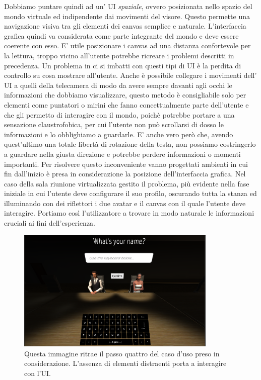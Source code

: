 Dobbiamo puntare quindi ad un' UI \textit{spaziale}, ovvero posizionata nello spazio del mondo virtuale ed indipendente dai movimenti del visore. Questo permette una navigazione visiva tra gli elementi dei canvas semplice e naturale. L'interfaccia grafica quindi va considerata come parte integrante del mondo e deve essere coerente con esso. E' utile posizionare i canvas ad una distanza confortevole per la lettura, troppo vicino all'utente potrebbe ricreare i problemi descritti in precedenza. Un problema in ci si imbatti con questi tipi di UI è la perdita di controllo su cosa mostrare all'utente. Anche è possibile collegare i movimenti dell' UI a quelli della telecamera di modo da avere sempre davanti agli occhi le informazioni che dobbiamo visualizzare, questo metodo è consigliabile solo per elementi come puntatori o mirini che fanno concettualmente parte dell'utente e che gli permetto di interagire con il mondo, poichè potrebbe portare a una sensazione claustrofobica, per cui l'utente non può scrollarsi di dosso le informazioni e lo obblighiamo a guardarle. E' anche vero però che, avendo quest'ultimo una totale libertà di rotazione della testa, non possiamo costringerlo a guardare nella giusta direzione e potrebbe perdere informazioni o momenti importanti. Per risolvere questo inconveniente vanno progettati ambienti in cui fin dall'inizio è presa in considerazione la posizione dell'interfaccia grafica. Nel caso della sala riunione virtualizzata gestito il problema, più evidente nella fase iniziale in cui l'utente deve configurare il suo profilo, oscurando tutta la stanza ed illuminando con dei riflettori i due avatar e il canvas con il quale l'utente deve interagire. Portiamo così l'utilizzatore a trovare in modo naturale le informazioni cruciali ai fini dell'esperienza. 
\begin{figure}[H]
	\includegraphics[width=0.85\textwidth]{figure/UIKeyboard}
	\centering
	\vspace{0.3cm}
	\caption{ Questa immagine ritrae il passo quattro del caso d'uso preso in considerazione. L'assenza di elementi distraenti porta a interagire con l'UI.}
\end{figure}

